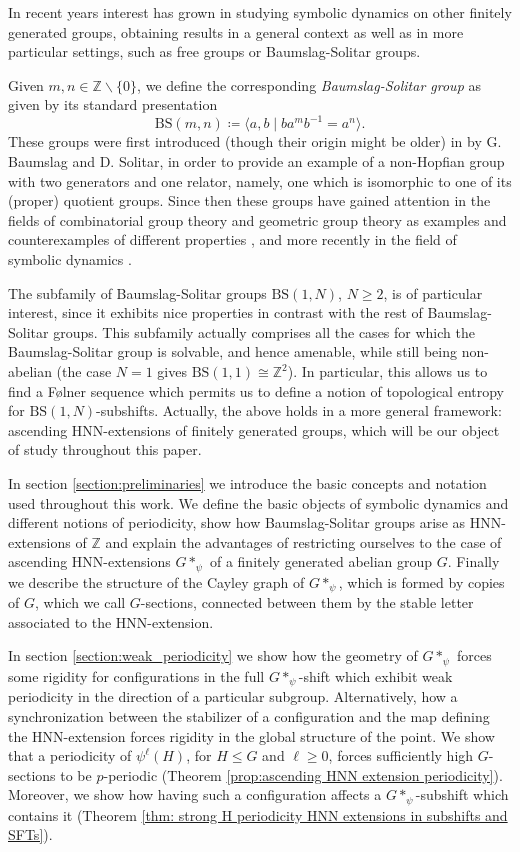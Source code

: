 \documentclass[letterpaper,11pt,reqno]{amsart}
\theoremstyle{plain}
\theoremstyle{definition}
\newcommand{\BS}[1][N]{\mathrm{BS}(1,#1)}
\begin{document}
In recent years interest has grown in studying symbolic dynamics on other finitely generated groups, obtaining results in a general context as well as in more particular settings, such as free groups or Baumslag-Solitar groups.

Given $m,n\in \mathbb{Z}\backslash \{0\}$, we define the corresponding \textit{Baumslag-Solitar group} as given by its standard presentation
$$
\mathrm{BS}(m,n)\coloneqq \langle a,b \mid ba^mb^{-1}=a^n \rangle.
$$
These groups were first introduced (though their origin might be older) in \cite{baumslag_solitar_1962} by G. Baumslag and D. Solitar, in order to provide an example of a non-Hopfian group with two generators and one relator, namely, one which is isomorphic to one of its (proper) quotient groups. Since then these groups have gained attention in the fields of combinatorial group theory and geometric group theory as examples and counterexamples of different properties \cite{harpe_2003,meskin_1972}, and more recently in the field of symbolic dynamics \cite{aubrun_kari_2013,cyr2016distortion,esnay2020weakly}.

The subfamily of Baumslag-Solitar groups $\BS$, $N\ge 2$, is of particular interest, since it exhibits nice properties in contrast with the rest of Baumslag-Solitar groups. This subfamily actually comprises all the cases for which the Baumslag-Solitar group is solvable, and hence amenable, while still being non-abelian (the case $N=1$ gives $\mathrm{BS}(1,1)\cong \mathbb{Z}^2$). In particular, this allows us to find a F\o lner sequence which permits us to define a notion of topological entropy for $\BS$-subshifts. Actually, the above holds in a more general framework: ascending HNN-extensions of finitely generated groups, which will be our object of study throughout this paper. 

In section \ref{section:preliminaries} we introduce the basic concepts and notation used throughout this work. We define the basic objects of symbolic dynamics and different notions of periodicity, show how Baumslag-Solitar groups arise as HNN-extensions of $\mathbb{Z}$ and explain the advantages of restricting ourselves to the case of ascending HNN-extensions $G*_{\psi}$ of a finitely generated abelian group $G$. Finally we describe the structure of the Cayley graph of $G*_{\psi}$, which is formed by copies of $G$, which we call $G$-sections, connected between them by the stable letter associated to the HNN-extension.

In section \ref{section:weak_periodicity} we show how the geometry of $G*_{\psi}$ forces some rigidity for configurations in the full $G*_{\psi}$-shift which exhibit weak periodicity in the direction of a particular subgroup. Alternatively, how a synchronization between the stabilizer of a configuration and the map defining the HNN-extension forces rigidity in the global structure of the point. We show that a periodicity of
$\psi^{\ell}(H)$, for $H\leqslant G$ and $\ell\ge 0$, forces sufficiently high $G$-sections to be $p$-periodic (Theorem \ref{prop:ascending HNN extension periodicity}). Moreover, we show how having such a configuration affects a $G*_{\psi}$-subshift which contains it (Theorem \ref{thm: strong H periodicity HNN extensions in subshifts and SFTs}).
\end{document}
